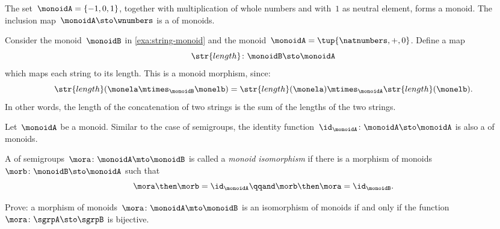 \begin{example}
  The set~$\monoidA = \{ -1, 0, 1 \}$, together with multiplication of whole numbers and with~$1$ as neutral element, forms a monoid. The inclusion map~$\monoidA \sto \wnumbers$ is a \whomo of monoids.
\end{example}

\begin{example}
  \label{exa:string-length}
  Consider the monoid~$\monoidB$ in \cref{exa:string-monoid} and the monoid~$\monoidA=\tup{\natnumbers, +,0}$.
  Define a map
  \begin{equation*}
  \str{length}\colon \monoidB \sto \monoidA
\end{equation*}
  which maps each string to its length. This is a monoid morphism, since:
\begin{equation*}
\str{length}(\monela \mtimes_\monoidB \monelb)=\str{length}(\monela)\mtimes_\monoidA \str{length}(\monelb).
\end{equation*}
  In other words, the length of the concatenation of two strings is the sum of the lengths of the two strings.
\end{example}



\begin{definition}
  \label{def:identity-mon-mor}
  Let~$\monoidA$ be a monoid. Similar to the case of semigroups, the identity function~$\id_\monoidA\colon \monoidA \sto \monoidA$ is also a \whomo of monoids.
\end{definition}



\begin{definition}
  \label{def:monoid-iso}
  A \whomo of semigroups~$\mora\colon \monoidA \mto \monoidB$ is called a \emph{monoid isomorphism} if there is a morphism of monoids~$\morb\colon \monoidB \sto \monoidA$ such that
  \begin{equation}
    \mora \then \morb = \id_\monoidA \qqand \morb \then \mora = \id_\monoidB.
  \end{equation}
\end{definition}


\begin{gradedexercise}
  Prove: a morphism of monoids~$\mora\colon \monoidA \mto \monoidB$ is an isomorphism of monoids if and only if the function~$\mora\colon \sgrpA \sto \sgrpB$ is bijective.
\end{gradedexercise}


